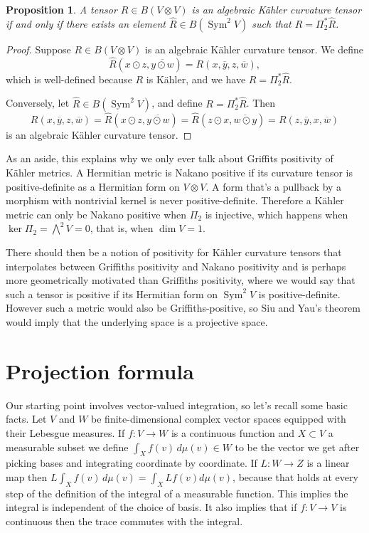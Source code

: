 \documentclass[10pt,a4paper]{amsart}
\newtheorem{prop}[theo]{Proposition}
\theoremstyle{definition}
\def\ov#1{\overline{#1}}
\def\d{\,d}
\DeclareMathOperator{\Sym}{Sym}
\begin{document}
\begin{prop}
A tensor $R \in B(V \otimes V)$ is an algebraic K\"ahler curvature tensor
if and only if there exists an element $\hat R \in B(\Sym^2 V)$ such that $R =
\Pi_2^* \hat R$.
\end{prop}

\begin{proof}
Suppose $R \in B(V \otimes V)$ is an algebraic K\"ahler curvature tensor.
We define
$$
\hat R(x \odot z, \ov{y \odot w})
= R(x, \ov y, z, \ov w),
$$
which is well-defined because $R$ is K\"ahler, and we have $R = \Pi_2^* \hat R$.

Conversely, let $\hat R \in B(\Sym^2 V)$, and define $R = \Pi_2^* \hat R$.
Then
$$
R(x, \ov y, z, \ov w)
= \hat R(x \odot z, \ov{y \odot w})
= \hat R(z \odot x, \ov{w \odot y})
= R(z, \ov y, x, \ov w)
$$
is an algebraic K\"ahler curvature tensor.
\end{proof}

As an aside, this explains why we only ever talk about Griffits
positivity of K\"ahler metrics.
A Hermitian metric is Nakano positive if its curvature tensor is
positive-definite as a Hermitian form on $V \otimes V$.
A form that's a pullback by a morphism with nontrivial
kernel is never positive-definite.
Therefore a K\"ahler metric can only be Nakano positive when $\Pi_2$ is
injective, which happens when $\ker \Pi_2 = \bigwedge^2 V = 0$,
that is, when $\dim V = 1$.

There should then be a notion of positivity for K\"ahler curvature tensors that
interpolates between Griffiths positivity and Nakano positivity and is perhaps
more geometrically motivated than Griffiths positivity, where we would say that
such a tensor is positive if its Hermitian form on $\Sym^2 V$ is
positive-definite.
However such a metric would also be Griffiths-positive, so Siu and Yau's
theorem would imply that the underlying space is a projective space.


\section{Projection formula}

Our starting point involves vector-valued integration, so let's recall
some basic facts.
Let $V$ and $W$ be finite-dimensional complex vector spaces equipped with their
Lebesgue measures.
If $f : V \to W$ is a continuous function and $X \subset V$ a measurable subset
we define $\int_X f(v) \d\mu(v) \in W$ to be the vector we get after picking
bases and integrating coordinate by coordinate.
If $L : W \to Z$ is a linear map then $L \int_X f(v) \d\mu(v) = \int_X Lf(v)
d\mu(v)$, because that holds at every step of the definition of the integral of
a measurable function.
This implies the integral is independent of the choice of basis.
It also implies that if $f : V \to V$ is continuous then the trace commutes
with the integral.
\end{document}
